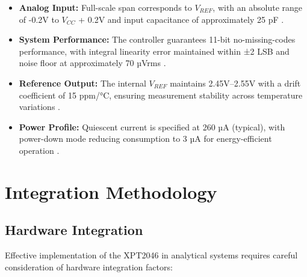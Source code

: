 \begin{itemize}
	\item \textbf{Analog Input:} Full-scale span corresponds to $V_{REF}$, with an absolute range of -0.2V to $V_{CC}$ + 0.2V and input capacitance of approximately 25 pF \cite{ xpt2046:2007}.
	
	\item \textbf{System Performance:} The controller guarantees 11-bit no-missing-codes performance, with integral linearity error maintained within ±2 LSB and noise floor at approximately 70 µVrms \cite{ xpt2046:2007}.
	
	\item \textbf{Reference Output:} The internal $V_{REF}$ maintains 2.45V–2.55V with a drift coefficient of 15 ppm/°C, ensuring measurement stability across temperature variations \cite{ xpt2046:2007}.
	
	\item \textbf{Power Profile:} Quiescent current is specified at 260 µA (typical), with power-down mode reducing consumption to 3 µA for energy-efficient operation \cite{ xpt2046:2007}.
\end{itemize}

\section{Integration Methodology}
\subsection{Hardware Integration}
Effective implementation of the XPT2046 in analytical systems requires careful consideration of hardware integration factors:

